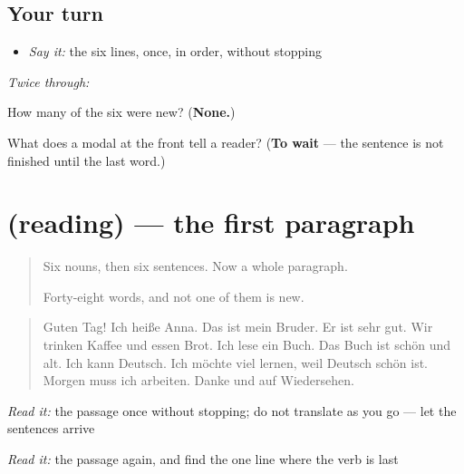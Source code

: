 \subsection*{Your turn}
\begin{itemize}
\raggedright
  \item \emph{Say it:} the six lines, once, in order, without stopping
\end{itemize}

\emph{Twice through:}

\begin{tcolorbox}[breakable,colback=teal!4,colframe=teal!35!black,title={Before you move on}]
How many of the six were new? (\textbf{None.})

What does a modal at the front tell a reader? (\textbf{To wait} — the sentence is not finished until the last word.)
\end{tcolorbox}
\section[(reading)]{(reading) — the first paragraph}

\label{lesson:GE-C52-erste-lesung}



\begin{quote}
Six nouns, then six sentences. Now a whole paragraph.

Forty-eight words, and not one of them is new.
\end{quote}

\begin{tcolorbox}[breakable,skin=enhanced,colback=orange!6,colframe=orange!45!black,boxrule=0.5pt,arc=1mm,left=6pt,right=6pt,top=4pt,bottom=4pt,fonttitle=\bfseries,title={Read this}]
\begin{quote}
Guten Tag! Ich heiße Anna. Das ist mein Bruder. Er ist sehr gut. Wir trinken Kaffee und essen Brot. Ich lese ein Buch. Das Buch ist schön und alt. Ich kann Deutsch. Ich möchte viel lernen, weil Deutsch schön ist. Morgen muss ich arbeiten. Danke und auf Wiedersehen.
\end{quote}

\emph{Read it:} the passage once without stopping; do not translate as you go — let the sentences arrive

\emph{Read it:} the passage again, and find the one line where the verb is last
\end{tcolorbox}

